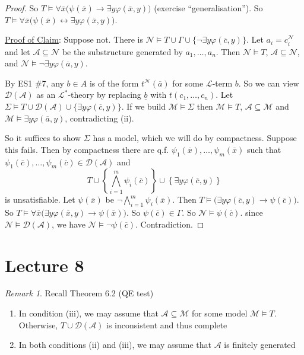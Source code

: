 \documentclass[]{article}
\theoremstyle{custhm}
\theoremstyle{cusdef}
\theoremstyle{custhm}
\theoremstyle{custhm}
\theoremstyle{custhm}
\theoremstyle{ex}
\theoremstyle{custhm}
\theoremstyle{cusdef}
\theoremstyle{remark}
\newtheorem*{remark*}{Remark}
\theoremstyle{remark}
\theoremstyle{numremark}
\renewcommand{\L}{\mathcal{L}}
\newcommand{\M}{\mathcal{M}}
\renewcommand{\phi}{\varphi}
\renewcommand{\bar}{\overline}
\newcommand{\N}{\mathcal{N}}
\newcommand{\A}{\mathcal{A}}
\newcommand{\D}{\mathcal{D}}
\renewcommand{\subset}{\subseteq}
\begin{document}
\begin{proof}
So $T\models \forall \bar{x}\big(\psi(\bar{x}) \rightarrow \exists y \phi(\bar{x},y)\big)$ (exercise ``generalisation''). So $T\models \forall \bar{x}\big(\psi(\bar{x})\leftrightarrow \exists y\phi(\bar{x},y)\big)$.

\underline{Proof of Claim}: Suppose not. There is $\N\models T\cup\Gamma \cup \{\neg \exists y\phi(\bar{c},y)\}$. Let $a_i = c_i^\N$ and let $\A\subset\N$ be the substructure generated by $a_1,\dots,a_n$. Then $\N\models T$, $\A\subset\N$, and $\N\models \neg \exists y\phi(\bar{a},y)$.

By ES1 \#7, any $b \in A$ is of the form $t^\N(\bar{a})$ for some $\L$-term $b$. So we can view $\D(\A)$ as an $\L^\ast$-theory by replacing $\underline{b}$ with $t(c_1,\dots,c_n)$. Let $\Sigma\models T\cup\D(\A)\cup\{\exists y\phi(\bar{c},y)\}$. If we build $\M\models \Sigma$ then $\M\models T$, $\A\subset \M$ and $\M\models \exists y \phi(\bar{a},y)$, contradicting (ii).

So it suffices to show $\Sigma$ has a model, which we will do by compactness. Suppose this fails. Then by compactness there are q.f. $\psi_1(\bar{x}),\dots,\psi_m(\bar{x})$ such that $\psi_1(\bar{c}),\dots,\psi_m(\bar{c})\in\D(\A)$ and $$ T\cup \left\lbrace \bigwedge_{i=1}^{m}\psi_i(\bar{c})\right\rbrace \cup \left\lbrace \exists y \phi(\bar{c},y)\right\rbrace$$ is unsatisfiable. Let $\psi(\bar{x})$ be $\neg \bigwedge_{i=1}^{m}\psi_i(\bar{x})$. Then $T\models \big(\exists y\phi(\bar{c},y)\rightarrow \psi(\bar{c})\big)$. So $T\models \forall \bar{x} \big(\exists y \phi(\bar{x},y)\rightarrow\psi(\bar{x})\big)$. So $\psi(\bar{c})\in \Gamma$. So $\N\models \psi(\bar{c})$. since $\N\models \D(\A)$, we have $\N\models \neg \psi(\bar{c})$. Contradiction.
\end{proof}


\section{Lecture 8}

\begin{remark*}
Recall Theorem 6.2 (QE test)
\begin{enumerate}[label=\arabic*)]
	\item In condition (iii), we may assume that $\A\subset\M$ for some model $\M\models T$. Otherwise, $T\cup \D(\A)$ is inconsistent and thus complete
	\item In both conditions (ii) and (iii), we may assume that $\A$ is finitely generated
\end{enumerate}
\end{remark*}
\end{document}
